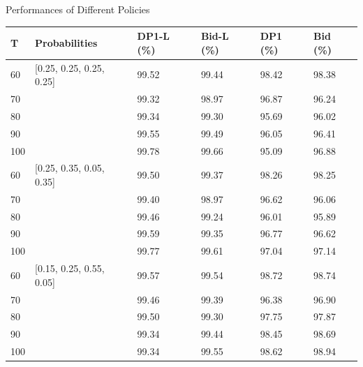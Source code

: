       \begin{frame}{Performances of Different Policies}
        \scriptsize
        \begin{table}[ht]
          \centering
          \begin{tabular}{|l|l|l|l|l|l|}
          \hline
           T & Probabilities &  DP1-L (\%) & Bid-L (\%) & DP1 (\%) & Bid (\%) \\
          \hline
          60  & [0.25, 0.25, 0.25, 0.25]  & 99.52 & 99.44 & 98.42 & 98.38 \\
          70  &   & 99.32 & 98.97 & 96.87 & 96.24 \\
          80  &   & 99.34 & 99.30 & 95.69 & 96.02 \\
          90  &   & 99.55 & 99.49 & 96.05 & 96.41  \\
          100 &   & 99.78 & 99.66 & 95.09 & 96.88 \\
          \hline
          60  & [0.25, 0.35, 0.05, 0.35]  & 99.50 & 99.37 & 98.26 & 98.25  \\
          70  &   & 99.40 & 98.97 & 96.62 & 96.06 \\
          80  &   & 99.46 & 99.24 & 96.01 & 95.89 \\
          90  &   & 99.59 & 99.35 & 96.77 & 96.62 \\
          100 &   & 99.77 & 99.61 & 97.04 & 97.14  \\
          \hline
          60  & [0.15, 0.25, 0.55, 0.05]  & 99.57 & 99.54 & 98.72 & 98.74 \\
          70  &   & 99.46 & 99.39  & 96.38 & 96.90 \\
          80  &   & 99.50 & 99.30  & 97.75 & 97.87 \\
          90  &   & 99.34 & 99.44  & 98.45 & 98.69 \\
          100 &   & 99.34 & 99.55  & 98.62 & 98.94 \\
          \hline
          \end{tabular}
        \end{table}

    \end{frame}